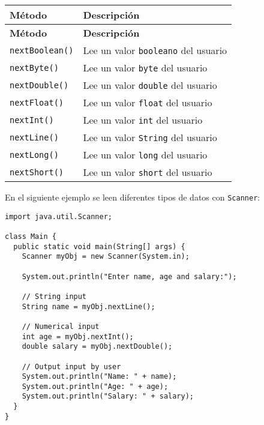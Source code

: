 \documentclass[12pt]{article}
\theoremstyle{largebreak}
\begin{document}
    \begin{longtable}{l p{}}
        \toprule
        \textbf{Método} & \textbf{Descripción} \\
        \midrule
        \endfirsthead

        \midrule
        \textbf{Método} & \textbf{Descripción} \\
        \midrule
        \endhead

        \bottomrule
        \endfoot

        \lstinline|nextBoolean()| & Lee un valor \lstinline|booleano| del usuario \\
        \lstinline|nextByte()| & Lee un valor \lstinline|byte| del usuario \\
        \lstinline|nextDouble()| & Lee un valor \lstinline|double| del usuario \\
        \lstinline|nextFloat()| & Lee un valor \lstinline|float| del usuario \\
        \lstinline|nextInt()| & Lee un valor \lstinline|int| del usuario \\
        \lstinline|nextLine()| & Lee un valor \lstinline|String| del usuario \\
        \lstinline|nextLong()| & Lee un valor \lstinline|long| del usuario \\
        \lstinline|nextShort()| & Lee un valor \lstinline|short| del usuario \\
    \end{longtable}

    \begin{exa}
        En el siguiente ejemplo se leen diferentes tipos de datos con \lstinline|Scanner|:
        \begin{lstlisting}[caption={Lectura diferentes tipos de datos con \lstinline|Scanner|.},label=DescriptiveLabel]
import java.util.Scanner;

class Main {
  public static void main(String[] args) {
    Scanner myObj = new Scanner(System.in);

    System.out.println("Enter name, age and salary:");

    // String input
    String name = myObj.nextLine();

    // Numerical input
    int age = myObj.nextInt();
    double salary = myObj.nextDouble();

    // Output input by user
    System.out.println("Name: " + name);
    System.out.println("Age: " + age);
    System.out.println("Salary: " + salary);
  }
}
        \end{lstlisting}
    \end{exa}
\end{document}

